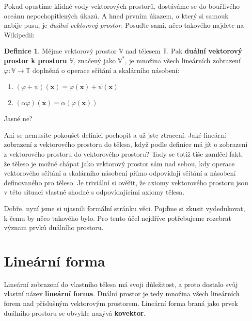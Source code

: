 \documentclass[a5paper,12pt]{amsbook}
\theoremstyle{definition}
\newtheorem{definition}{Definice}[chapter]
\newcommand{\myscalar}[1]{#1}
\newcommand{\myvec}[1]{\mathbf{#1}}
\newcommand{\myspace}[1]{\mathbb{#1}}
\newcommand{\mymap}[1]{#1}
\newcommand{\mydual}[1]{\myspace{#1^{*}}}
\begin{document}
\noindent Pokud opustíme klidné vody vektorových prostorů, dostáváme se do bouřlivého oceánu
nepochopitlených úkazů. A hned prvním úkazem, o který si samouk nabije pusu, je \textit{duální
vektorový prostor}. Posuďte sami, něco takového najdete na Wikipedii:

\begin{definition}
Mějme vektorový prostor $\myspace{V}$ nad tělesem $\myspace{T}$. Pak \textbf{duální vektorový
prostor k prostoru $\myspace{V}$}, značený jako $\mydual{V}$, je množina všech lineárních
zobrazení $\mymap{\varphi}: \myspace{V}\rightarrow\myspace{T}$ doplněná o operace sčítání
a skalárního násobení:

\begin{enumerate}
  \item $(\mymap{\varphi} + \mymap{\psi})(\myvec{x}) = \mymap{\varphi}(\myvec{x}) + \mymap{\psi}(\myvec{x})$
  \item $(\myscalar{\alpha}\mymap{\varphi})(\myvec{x}) = \myscalar{\alpha}(\mymap{\varphi}(\myvec{x}))$
\end{enumerate}

\end{definition}

\noindent Jasné ne?

Ani se nemusíte pokoušet definici pochopit a už jste ztracení. Jaké lineární zobrazení z vektorového
prostoru do tělesa, když podle definice má jít o zobrazení z vektorového prostoru do vektorového
prostoru? Tady se totiž tiše zamlčel fakt, že těleso je možné chápat jako vektorový prostor sám
nad sebou, kdy operace vektorového sčítání a skalárního násobení přímo odpovídají sčítání a násobení
definovaného pro těleso. Je triviální si ověřit, že axiomy vektorového prostoru jsou v této situaci
vlastně shodné s odpovídajícími axiomy tělesa.

Dobře, nyní jsme si ujasnili formální stránku věci. Pojďme si zkusit vydedukovat, k čemu by něco
takového bylo. Pro tento účel nejdříve potřebujeme rozebrat význam prvků duálního prostoru.

\section{Lineární forma}

\noindent Lineární zobrazení do vlastního tělesa má svoji důležitost, a proto dostalo svůj vlastní
název \textbf{lineární forma}. Duální prostor je tedy množina všech lineárních forem nad příslušným
vektorovým prostorem. Lineární forma braná jako prvek duálního prostoru se obvykle nazývá 
\textbf{kovektor}.
\end{document}

